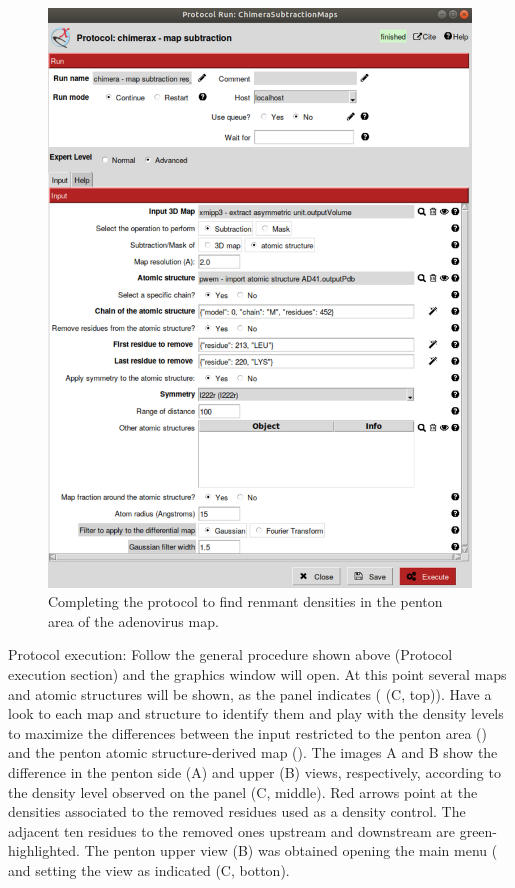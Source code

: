 \begin{itemize}
                            \begin{figure}[H]
                            \centering 
                            \captionsetup{width=.9\linewidth} 
                            \includegraphics[width=.50\textwidth]{Images_appendix/Fig311.pdf}
                            \caption{Completing the protocol  to find renmant densities in the penton area of the adenovirus map.}  
                            \label{fig:app_usecase_mapsubtract_2}
                            \end{figure}
                Protocol execution: Follow the general procedure shown above (Protocol execution section) and the \chimera graphics window will open. At this point several maps and atomic structures will be shown, as the  panel indicates ( (C, top)). Have a look to each map and structure to identify them and play with the density levels to maximize the differences between the input  restricted to the penton area () and the penton atomic structure-derived map (). The  images A and B show the difference  in the penton side (A) and upper (B) views, respectively, according to the density level observed on the  panel (C, middle). Red arrows point at the densities associated to the removed residues used as a density control. The adjacent ten residues to the removed ones upstream and downstream are green-highlighted. The penton upper view (B) was obtained opening the \chimera main menu ( and setting the view as indicated (C, botton). 

\end{itemize}

